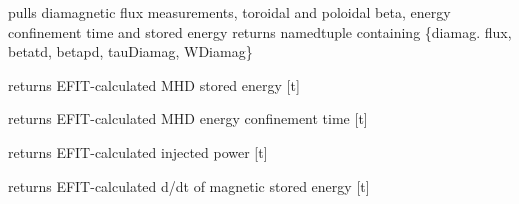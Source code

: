 \documentclass[letterpaper,10pt,english]{sphinxmanual}
\begin{document}
\begin{fulllineitems}
\begin{fulllineitems}
\end{fulllineitems}


\begin{fulllineitems}
\label{eqtools:eqtools.EFIT.EFITTree.getDiamag}
pulls diamagnetic flux measurements, toroidal and poloidal beta, energy confinement time and stored energy
returns namedtuple containing \{diamag. flux, betatd, betapd, tauDiamag, WDiamag\}

\end{fulllineitems}


\begin{fulllineitems}
\label{eqtools:eqtools.EFIT.EFITTree.getWMHD}
returns EFIT-calculated MHD stored energy {[}t{]}

\end{fulllineitems}


\begin{fulllineitems}
\label{eqtools:eqtools.EFIT.EFITTree.getTauMHD}
returns EFIT-calculated MHD energy confinement time {[}t{]}

\end{fulllineitems}


\begin{fulllineitems}
\label{eqtools:eqtools.EFIT.EFITTree.getPinj}
returns EFIT-calculated injected power {[}t{]}

\end{fulllineitems}


\begin{fulllineitems}
\label{eqtools:eqtools.EFIT.EFITTree.getWbdot}
returns EFIT-calculated d/dt of magnetic stored energy {[}t{]}

\end{fulllineitems}



\end{fulllineitems}
\end{document}
